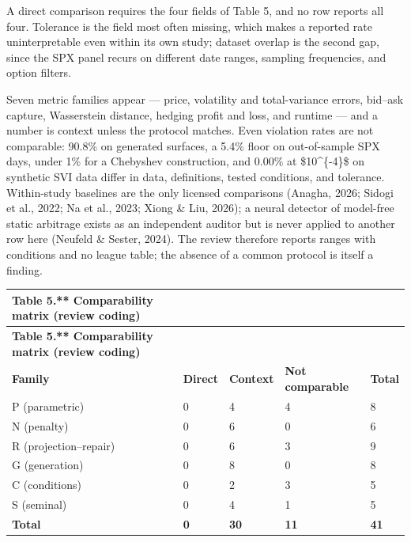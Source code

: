 \documentclass[11pt]{article}
\begin{document}
A direct comparison requires the four fields of Table 5, and no row reports all four. Tolerance is the field most often missing, which makes a reported rate uninterpretable even within its own study; dataset overlap is the second gap, since the SPX panel recurs on different date ranges, sampling frequencies, and option filters.

Seven metric families appear — price, volatility and total-variance errors, bid–ask capture, Wasserstein distance, hedging profit and loss, and runtime — and a number is context unless the protocol matches. Even violation rates are not comparable: 90.8\% on generated surfaces, a 5.4\% floor on out-of-sample SPX days, under 1\% for a Chebyshev construction, and 0.00\% at \$10\textasciicircum{}\{-4\}\$ on synthetic SVI data differ in data, definitions, tested conditions, and tolerance. Within-study baselines are the only licensed comparisons (Anagha, 2026; Sidogi et al., 2022; Na et al., 2023; Xiong \& Liu, 2026); a neural detector of model-free static arbitrage exists as an independent auditor but is never applied to another row here (Neufeld \& Sester, 2024). The review therefore reports ranges with conditions and no league table; the absence of a common protocol is itself a finding.

\begingroup\small
\begin{longtable}{@{}p{}p{}p{}p{}p{}@{}}
\toprule
\textbf{Table 5.** Comparability matrix (review coding)} & \textbf{} & \textbf{} & \textbf{} & \textbf{} \\
\midrule
\endfirsthead
\toprule
\textbf{Table 5.** Comparability matrix (review coding)} & \textbf{} & \textbf{} & \textbf{} & \textbf{} \\
\midrule
\endhead
\textbf{Family} & \textbf{Direct} & \textbf{Context} & \textbf{Not comparable} & \textbf{Total} \\
P (parametric) & 0 & 4 & 4 & 8 \\
N (penalty) & 0 & 6 & 0 & 6 \\
R (projection–repair) & 0 & 6 & 3 & 9 \\
G (generation) & 0 & 8 & 0 & 8 \\
C (conditions) & 0 & 2 & 3 & 5 \\
S (seminal) & 0 & 4 & 1 & 5 \\
\textbf{Total} & \textbf{0} & \textbf{30} & \textbf{11} & \textbf{41} \\
\bottomrule
\end{longtable}
\endgroup
\end{document}

